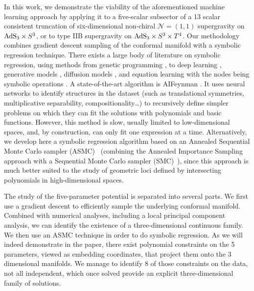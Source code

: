 \documentclass[11pt,a4paper]{article}
\begin{document}
In this work, we demonstrate the viability of the aforementioned machine learning approach by applying it to a five-scalar subsector of a 13 scalar consistent truncation of six-dimensional non-chiral $\mathcal{N} = (1,1)$ supergravity on ${\rm AdS}_3 \times S^3$, or to type IIB supergravity on ${\rm AdS}_3 \times S^3 \times T^4$. Our methodology combines gradient descent sampling of the conformal manifold with a symbolic regression technique. There exists a large body of literature on symbolic regression, using methods from genetic programming \cite{koza1994genetic,virgolin2021improving,randall2022bingo,burlacu2019parsimony}, to deep learning \cite{petersen2019deep,kamienny2022end}, generative models \cite{valipour2021symbolicgpt}, diffusion models \cite{bastiani2025diffusion}, and equation learning with the nodes being symbolic operations \cite{2018arXiv180607259S}. A state-of-the-art algorithm is AIFeynman \cite{Udrescu:2019mnk}. It uses neural networks to identify structures in the dataset (such as translational symmetries, multiplicative separability, compositionality\dots) to recursively define simpler problems on which they can fit the solutions with polynomials and basic functions.  However, this method is slow, usually limited to low-dimensional spaces, and, by construction, can only fit one expression at a time. Alternatively, we develop here a symbolic regression algorithm based on an Annealed Sequential Monte Carlo sampler (ASMC)~\cite{zimmermann2021nested,syed2024optimisedannealedsequentialmonte} (combining the Annealed Importance Sampling~\cite{neal1998annealedimportancesampling} approach with a Sequential Monte Carlo sampler (SMC)~\cite{del2006sequential}), since this approach is much better suited to the study of geometric loci defined by intersecting polynomials in high-dimensional spaces.


The study of the five-parameter potential is separated into several parts. We first use a gradient descent to efficiently sample the underlying conformal manifold. Combined with numerical analyses, including a local principal component analysis, we can identify the existence of a three-dimensional continuous family. We then use an ASMC technique in order to do symbolic regression. As we will indeed demonstrate in the paper, there exist polynomial constraints on the 5 parameters, viewed as embedding coordinates, that project them onto the 3 dimensional manifolds. We manage to identify 8 of those constraints on the data, not all independent, which once solved  provide an explicit three-dimensional family of solutions.
\end{document}

